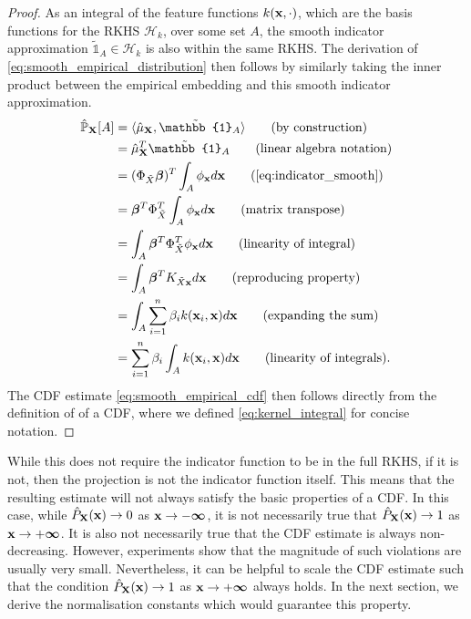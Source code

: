 \documentclass[twoside]{article} \usepackage{aistats2017}
\theoremstyle{definition}
\theoremstyle{theorem}
\newcommand{\rv}[1]{{#1}}
\newcommand{\ds}[1]{\tilde{#1}}
\newcommand{\inner}[2]{{\langle #1, #2 \rangle}}
\begin{document}
		\begin{proof}
			As an integral of the feature functions $k(\mathbf{x}, \cdot)$, which are the basis functions for the RKHS $\mathcal{H}_{k}$, over some set $A$, the smooth indicator approximation $\tilde{\mathbb{1}}_{A} \in \mathcal{H}_{k}$ is also within the same RKHS. The derivation of \eqref{eq:smooth_empirical_distribution} then follows by similarly taking the inner product between the empirical embedding and this smooth indicator approximation.	
			\begin{align*}
					\hat{\mathbb{P}}_{\bvec{\rv{X}}}[A] &= \inner{\hat{\mu}_{\bvec{\rv{X}}}}{\tilde{\mathbb{1}}_{A}} \tag{by construction} \\
					&= \hat{\mu}_{\bvec{\rv{X}}}^{T} \tilde{\mathbb{1}}_{A} \tag{linear algebra notation} \\
					&= (\Phi_{\ds{X}} \bm{\beta})^{T} \int_{A} \phi_{\bvec{x}} d\bvec{x} \tag{\cref{eq:indicator_smooth}} \\
					&= \bm{\beta}^{T} \Phi_{\ds{X}}^{T} \int_{A} \phi_{\bvec{x}} d\bvec{x} \tag{matrix transpose}\\
					&= \int_{A} \bm{\beta}^{T} \Phi_{\ds{X}}^{T} \phi_{\bvec{x}} d\bvec{x} \tag{linearity of integral} \\
					&= \int_{A} \bm{\beta}^{T} K_{\ds{X} \bvec{x}} d\bvec{x} \tag{reproducing property} \\
					&= \int_{A} \sum_{i = 1}^{n} \beta_{i} k(\bvec{x}_{i}, \bvec{x}) d\bvec{x} \tag{expanding the sum} \\
					&= \sum_{i = 1}^{n} \beta_{i} \int_{A}  k(\bvec{x}_{i}, \bvec{x}) d\bvec{x} \tag{linearity of integrals}.
			\end{align*}
			The CDF estimate \eqref{eq:smooth_empirical_cdf} then follows directly from the definition of of a CDF, where we defined \eqref{eq:kernel_integral} for concise notation.
		\end{proof}
		
		While this does not require the indicator function to be in the full RKHS, if it is not, then the projection is not the indicator function itself. This means that the resulting estimate will not always satisfy the basic properties of a CDF. In this case, while $\hat{P}_{\bvec{\rv{X}}}(\bvec{x}) \to 0$ as $\mathbf{x} \to -\bm{\infty}$, it is not necessarily true that $\hat{P}_{\bvec{\rv{X}}}(\bvec{x}) \to 1$ as $\mathbf{x} \to +\bm{\infty}$. It is also not necessarily true that the CDF estimate is always non-decreasing. However, experiments show that the magnitude of such violations are usually very small. Nevertheless, it can be helpful to scale the CDF estimate such that the condition $\hat{P}_{\bvec{\rv{X}}}(\bvec{x}) \to 1$ as $\mathbf{x} \to +\bm{\infty}$ always holds. In the next section, we derive the normalisation constants which would guarantee this property.
\end{document}
